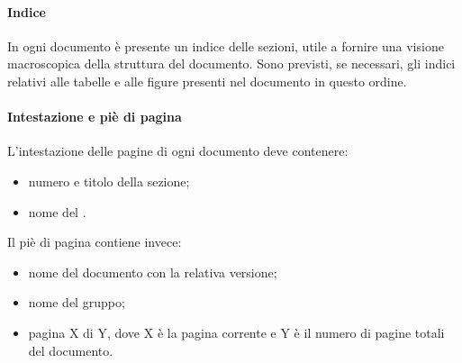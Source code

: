  \paragraph{Indice}
 In ogni documento è presente un indice delle sezioni, utile a fornire una visione macroscopica della struttura del documento. Sono previsti, se necessari, gli indici relativi alle tabelle e alle figure presenti nel documento in questo ordine.
 \paragraph{Intestazione e piè di pagina}
L'intestazione delle pagine di ogni documento deve contenere:
\begin{itemize}
	\item numero e titolo della sezione;
	\item nome del .
\end{itemize} 
Il piè di pagina contiene invece:
\begin{itemize}
	\item nome del documento con la relativa versione;
	\item nome del gruppo;
	\item pagina X di Y, dove X è la pagina corrente e Y è il numero di pagine totali del documento.
\end{itemize} 
